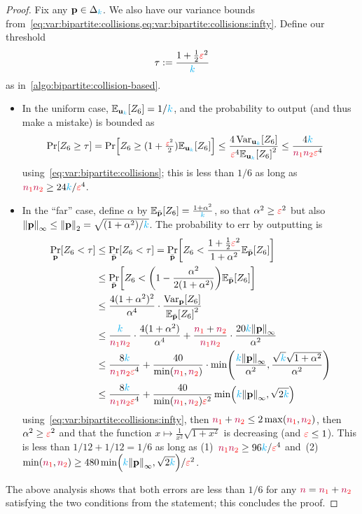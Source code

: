 \begin{proof}
Fix any $\mathbf{p}\in\Delta_{{\textcolor{cyan}{k}}}$. We also have our variance bounds from~\cref{eq:var:bipartite:collisions,eq:var:bipartite:collisions:infty}. Define our threshold
\[
    \tau := \frac{1+\frac{1}{2}\textcolor{red}{\varepsilon}^2}{{\textcolor{cyan}{k}}}
\]
as in~\cref{algo:bipartite:collision-based}.
\begin{itemize}
    \item In the uniform case, $\bE{\uniform_\ab}{Z_6} = 1/\ab$, and the probability to output \reject (and thus make a mistake) is bounded as
    \begin{align*}
    \bPr{Z_6 \geq \tau} 
    &= \bPr{Z_6 \geq (1+\tfrac{\dst^2}{2})\bE{\uniform_\ab}{Z_6}}  \leq \frac{4\Var_{\uniform_\ab}[Z_6]}{\dst^4\bE{\uniform_\ab}{Z_6}^2} 
    \leq \frac{4\ab}{\nss\nst\dst^4}
    \end{align*}
    using~\cref{eq:var:bipartite:collisions}; this is less than $1/6$ as long as $\textcolor{red}{{\textcolor{purple}{n}}_1}\textcolor{red}{{\textcolor{purple}{n}}_2} \geq 24{\textcolor{cyan}{k}}/\textcolor{red}{\varepsilon}^4$.
    \item In the ``far'' case, define $\alpha$ by $\bE{\bar{\p}}{Z_6} = \frac{1+\alpha^2}{\ab}$, so that $\alpha^2\geq \textcolor{red}{\varepsilon}^2$ but also
    $
        \norminf{\p} \leq \normtwo{\p} = \sqrt{(1+\alpha^2)/\ab}
    $. The probability to err by outputting \accept is
    \begin{align*}
        \bP{\p}{Z_6 < \tau}  
        &\leq \bP{\bar{\p}}{Z_6 <  \tau} 
        = \bP{\bar{\p}}{Z_6 <  \frac{1+\frac{1}{2}\dst^2}{1+\alpha^2} \bE{\bar{\p}}{Z_6} } \\
        &\leq \bP{\bar{\p}}{Z_6 <  \Paren{1 - \frac{\alpha^2}{2(1+\alpha^2)}} \bE{\bar{\p}}{Z_6} } \\
        &\leq \frac{4(1+\alpha^2)^2}{\alpha^4}\cdot \frac{\Var_{\p}[Z_6]}{\bE{\bar{\p}}{Z_6}^2} \\
        &\leq \frac{\ab}{\nss\nst}\cdot \frac{4(1+\alpha^2)}{\alpha^4} + \frac{\nss+\nst}{\nss\nst}\cdot \frac{20\ab\norminf{\p}}{\alpha^2}  \\
        &\leq \frac{8\ab}{\nss\nst\dst^4} + \frac{40}{\min(\nss,\nst)}\cdot \min\Paren{ \frac{\ab\norminf{\p}}{\alpha^2}, \frac{\sqrt{\ab}\sqrt{1+\alpha^2}}{\alpha^2} } \\
        &\leq \frac{8\ab}{\nss\nst\dst^4} + \frac{40}{\min(\nss,\nst)\dst^2}\min\Paren{\ab\norminf{\p}, \sqrt{2\ab}}
    \end{align*}
    using~\cref{eq:var:bipartite:collisions:infty}, then $\textcolor{red}{{\textcolor{purple}{n}}_1}+\textcolor{red}{{\textcolor{purple}{n}}_2}\leq 2\max(\textcolor{red}{{\textcolor{purple}{n}}_1},\textcolor{red}{{\textcolor{purple}{n}}_2})$, then $\alpha^2\geq \textcolor{red}{\varepsilon}^2$ and that the function $x\mapsto \frac{1}{x^2}\sqrt{1+x^2}$ is decreasing (and $\textcolor{red}{\varepsilon} \leq 1$). This is less than $1/12+1/12=1/6$ as long as (1)~$\textcolor{red}{{\textcolor{purple}{n}}_1}\textcolor{red}{{\textcolor{purple}{n}}_2} \geq 96{\textcolor{cyan}{k}}/\textcolor{red}{\varepsilon}^4$ and~(2) $\min(\nss,\nst) \geq 480\min\Paren{\ab\norminf{\p}, \sqrt{2\ab}}/\dst^2$.
\end{itemize}
  The above analysis shows that both errors are less than $1/6$ for any ${\textcolor{purple}{n}} = \textcolor{red}{{\textcolor{purple}{n}}_1}+\textcolor{red}{{\textcolor{purple}{n}}_2}$ satisfying the two conditions from the statement; this concludes the proof.
\end{proof}

